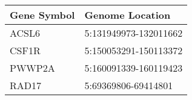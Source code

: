 \begin{tabular}{ll}
\toprule
Gene Symbol &       Genome Location \\
\midrule
      ACSL6 & 5:131949973-132011662 \\
      CSF1R & 5:150053291-150113372 \\
     PWWP2A & 5:160091339-160119423 \\
      RAD17 &   5:69369806-69414801 \\
\bottomrule
\end{tabular}
